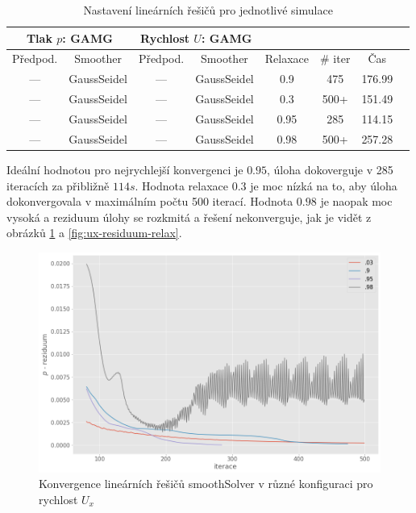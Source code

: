 \documentclass[a4paper,12pt]{report}
\theoremstyle{remark}
\begin{document}
 \begin{table}[H]
	\centering
	\caption{Nastavení lineárních řešičů pro jednotlivé simulace}
	\renewcommand{\arraystretch}{1.9}
	\begin{tabular}{*8c}
		\toprule
		\multicolumn{2}{c}{Tlak $p$: \textbf{GAMG}} & \multicolumn{2}{c}{Rychlost $U$: \textbf{GAMG}}\\		
		\midrule
		Předpod.&Smoother&Předpod.&Smoother&Relaxace& \# iter&Čas\\
		
		\midrule
		
		--- & GaussSeidel &  --- & GaussSeidel & 0.9&475&176.99\\
		--- & GaussSeidel &  --- & GaussSeidel & 0.3&500+&151.49\\
		--- & GaussSeidel &  --- & GaussSeidel & 0.95&285&114.15\\
		--- & GaussSeidel &  --- & GaussSeidel & 0.98&500+&257.28\\		
		\bottomrule
	\end{tabular}
	
	\label{table:solvers_gamg_relax}
	
\end{table}

Ideální hodnotou pro nejrychlejší konvergenci je $0.95$, úloha dokoverguje v 285 iteracích za přibližně $114s$. Hodnota relaxace $0.3$ je moc nízká na to, aby úloha dokonvergovala v maximálním počtu 500 iterací.  Hodnota $0.98$ je naopak moc vysoká a reziduum úlohy se rozkmitá a řešení nekonverguje, jak je vidět z obrázků \ref{fig:p-residuum-relax} a \ref{fig:ux-residuum-relax}.

\begin{figure}[H]
	\centering
	\includegraphics[width=1\linewidth]{p-under-relax.png}
	\caption{Konvergence lineárních řešičů smoothSolver v různé konfiguraci pro rychlost $U_x$}
	\label{fig:p-residuum-relax}
\end{figure}
\end{document}
